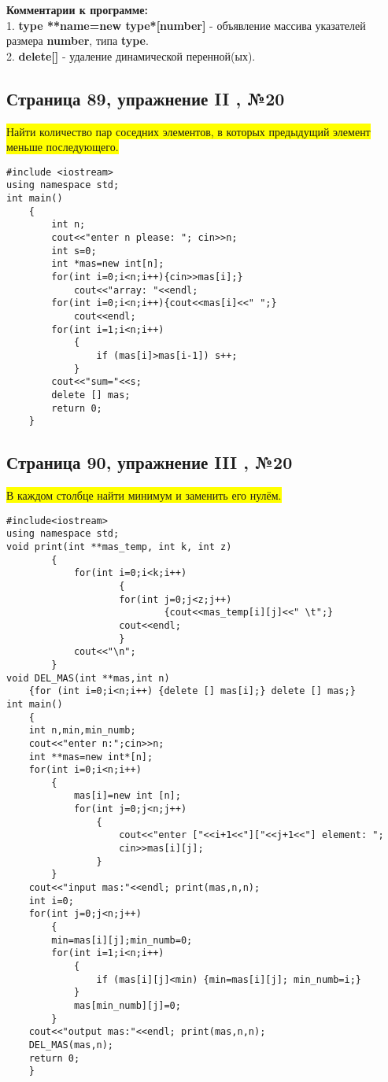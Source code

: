 \documentclass[11pt]{article}
\begin{document}
\begin{flushleft}
\textbf{Комментарии к программе:} \\
1. \textbf{type **name=new type*[number]} - объявление массива указателей размера \textbf{number}, типа \textbf{type}.\\
2. \textbf{delete[]} - удаление динамической перенной(ых).\\
\newpage
\begin{center}
\section{Страница 89, упражнение II , №20}
\colorbox{yellow}{Найти количество пар соседних элементов, в которых предыдущий элемент меньше последующего.}
\end{center}
\begin{lstlisting}
#include <iostream>
using namespace std;
int main()
	{
		int n;
		cout<<"enter n please: "; cin>>n;
		int s=0;
		int *mas=new int[n];	
		for(int i=0;i<n;i++){cin>>mas[i];}
			cout<<"array: "<<endl; 
		for(int i=0;i<n;i++){cout<<mas[i]<<" ";}
			cout<<endl;
		for(int i=1;i<n;i++)
			{
				if (mas[i]>mas[i-1]) s++;
			}
		cout<<"sum="<<s;
		delete [] mas;
		return 0;
	}
\end{lstlisting}

\newpage
\begin{center}
\section{Страница 90, упражнение III , №20}
\colorbox{yellow}{В каждом столбце найти минимум и заменить его нулём.}
\end{center}
\begin{lstlisting}
#include<iostream>
using namespace std;
void print(int **mas_temp, int k, int z)
        {
		    for(int i=0;i<k;i++)
		            {
		            for(int j=0;j<z;j++)
		                    {cout<<mas_temp[i][j]<<" \t";}
					cout<<endl;
		            }
			cout<<"\n";
        }
void DEL_MAS(int **mas,int n)
	{for (int i=0;i<n;i++) {delete [] mas[i];} delete [] mas;} 
int main()
	{
	int n,min,min_numb;
	cout<<"enter n:";cin>>n;
	int **mas=new int*[n];
	for(int i=0;i<n;i++)
		{
			mas[i]=new int [n];
			for(int j=0;j<n;j++)
				{
					cout<<"enter ["<<i+1<<"]["<<j+1<<"] element: ";
					cin>>mas[i][j];
				}
		}
	cout<<"input mas:"<<endl; print(mas,n,n);
	int i=0;
	for(int j=0;j<n;j++)
		{
		min=mas[i][j];min_numb=0;
		for(int i=1;i<n;i++)
			{
				if (mas[i][j]<min) {min=mas[i][j]; min_numb=i;}      
            }
        	mas[min_numb][j]=0;
		}
	cout<<"output mas:"<<endl; print(mas,n,n);
	DEL_MAS(mas,n);
	return 0;
	}
\end{lstlisting}


\end{flushleft}
\end{document}
